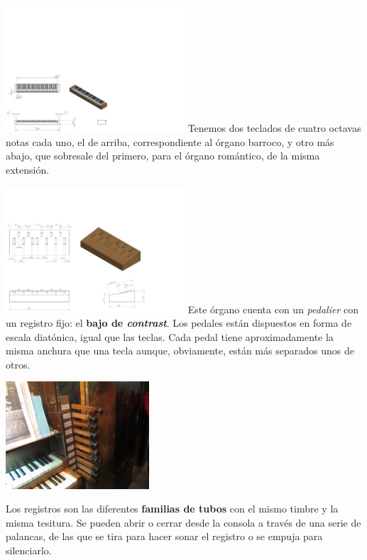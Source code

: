 \documentclass[10pt,a4paper]{article}
\begin{document}
	\begin{multicols}{2}
		\noindent
		\includegraphics[width=0.5\textwidth]{images/teclado_modelo} 
		\columnbreak
		Tenemos dos teclados de cuatro octavas notas cada uno, el de arriba, correspondiente al órgano barroco, y otro más abajo, que sobresale del primero, para el órgano romántico, de la misma extensión.
	\end{multicols}
	
	\begin{multicols}{2}
		\noindent
		\includegraphics[width=0.5\textwidth]{images/pedalier_modelo} 
		\columnbreak
		Este órgano cuenta con un \textit{pedalier} con un registro fijo: el \textbf{bajo de \textit{contrast}}. Los pedales están dispuestos en forma de escala diatónica, igual que las teclas. Cada pedal tiene aproximadamente la misma anchura que una tecla aunque, obviamente, están más separados unos de otros.
	\end{multicols}
	
	\begin{multicols}{2}
		\noindent
		\begin{center}
			\includegraphics[width=0.4\textwidth]{images/registros} 
		\end{center}
		\columnbreak
		Los registros son las diferentes \textbf{familias de tubos} con el mismo timbre y la misma tesitura. Se pueden abrir o cerrar desde la consola a través de una serie de palancas, de las que se tira para hacer sonar el registro o se empuja para silenciarlo.
	\end{multicols}
	
\end{document}
